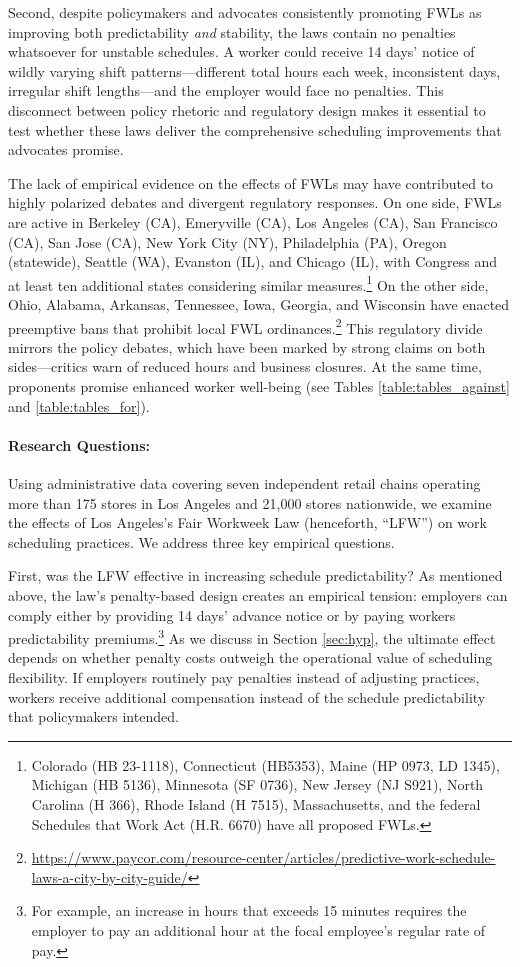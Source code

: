\documentclass[letterpaper,11pt,leqno]{article}
\theoremstyle{paper}
\begin{document}
Second, despite policymakers and advocates consistently promoting FWLs as improving both predictability \textit{and} stability, the laws contain no penalties whatsoever for unstable schedules. A worker could receive 14 days' notice of wildly varying shift patterns—different total hours each week, inconsistent days, irregular shift lengths—and the employer would face no penalties. This disconnect between policy rhetoric and regulatory design makes it essential to test whether these laws deliver the comprehensive scheduling improvements that advocates promise.

The lack of empirical evidence on the effects of FWLs may have contributed to highly polarized debates and divergent regulatory responses. On one side, FWLs are active in Berkeley (CA), Emeryville (CA), Los Angeles (CA), San Francisco (CA), San Jose (CA), New York City (NY), Philadelphia (PA), Oregon (statewide), Seattle (WA), Evanston (IL), and Chicago (IL), with Congress and at least ten additional states considering similar measures.\footnote{Colorado (HB 23-1118), Connecticut (HB5353), Maine (HP 0973, LD 1345), Michigan (HB 5136), Minnesota (SF 0736), New Jersey (NJ S921), North Carolina (H 366), Rhode Island (H 7515), Massachusetts, and the federal Schedules that Work Act (H.R. 6670) have all proposed FWLs.} On the other side, Ohio, Alabama, Arkansas, Tennessee, Iowa, Georgia, and Wisconsin have enacted preemptive bans that prohibit local FWL ordinances.\footnote{\url{https://www.paycor.com/resource-center/articles/predictive-work-schedule-laws-a-city-by-city-guide/}} This regulatory divide mirrors the policy debates, which have been marked by strong claims on both sides—critics warn of reduced hours and business closures. At the same time, proponents promise enhanced worker well-being (see Tables \ref{table:tables_against} and \ref{table:tables_for}).

\paragraph{Research Questions:}
Using administrative data covering seven independent retail chains operating more than 175 stores in Los Angeles and 21,000 stores nationwide, we examine the effects of Los Angeles's Fair Workweek Law (henceforth, ``LFW'') on work scheduling practices. We address three key empirical questions.  

First, was the LFW effective in increasing schedule predictability? As mentioned above, the law's penalty-based design creates an empirical tension: employers can comply either by providing 14 days' advance notice or by paying workers predictability premiums.\footnote{For example, an increase in hours that exceeds 15 minutes requires the employer to pay an additional hour at the focal employee’s regular rate of pay.} As we discuss in Section \ref{sec:hyp}, the ultimate effect depends on whether penalty costs outweigh the operational value of scheduling flexibility. If employers routinely pay penalties instead of adjusting practices, workers receive additional compensation instead of the schedule predictability that policymakers intended.
\end{document}
